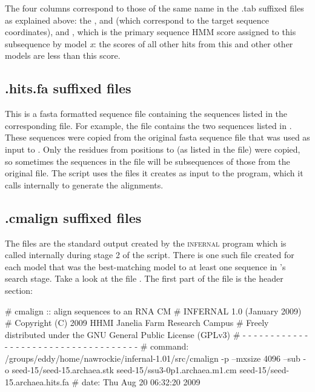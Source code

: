 The four columns correspond to those of the same name in the {.tab}
suffixed files as explained above: the ,
 and  (which correspond to the target sequence
coordinates), and , which is the primary sequence HMM
score assigned to this subsequence by model \emph{x}: the scores of
all other hits from this and other other models are less than
this score.

\subsection{.hits.fa suffixed files}
This is a fasta formatted sequence file containing the sequences
listed in the corresponding  file. For example, the
file  contains the two sequences
listed in . These sequences were
copied from the original fasta sequence file  that
was used as input to . Only the residues from
positions  to  (as listed in the
 file) were copied, so sometimes the sequences in the
 file will be subsequences of those from the original
file.  The  script uses the  files it
creates as input to the  program, which it calls
internally to generate the alignments.

\subsection{.cmalign suffixed files}

The  files are the standard output created by the
\textsc{infernal} program  which is called internally
during stage 2 of the  script. There is one such file
created for each model that was the best-matching model to at least
one sequence in 's search stage. Take a look at the
file . The first part of the file
is the header section:

\begin{sreoutput}
# cmalign :: align sequences to an RNA CM
# INFERNAL 1.0 (January 2009)
# Copyright (C) 2009 HHMI Janelia Farm Research Campus
# Freely distributed under the GNU General Public License (GPLv3)
# - - - - - - - - - - - - - - - - - - - - - - - - - - - - - - - - - - - -
# command: /groups/eddy/home/nawrockie/infernal-1.01/src/cmalign -p --mxsize 4096 --sub -o 
seed-15/seed-15.archaea.stk seed-15/ssu3-0p1.archaea.m1.cm seed-15/seed-15.archaea.hits.fa
# date:    Thu Aug 20 06:32:20 2009
\end{sreoutput}

